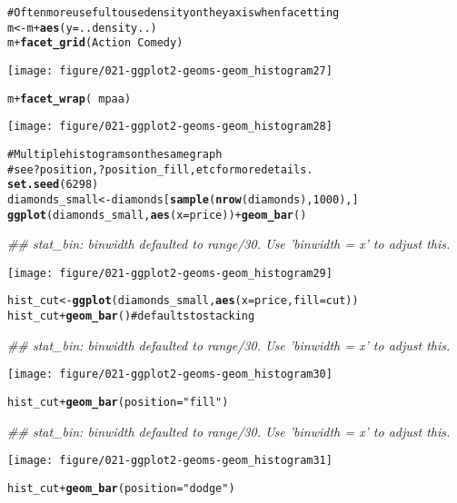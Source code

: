 \documentclass[a4paper,titlepage]{tufte-handout}\usepackage{graphicx, color}
\makeatletter
\def\maxwidth{ %
  \ifdim\Gin@nat@width>\linewidth
    \linewidth
  \else
    \Gin@nat@width
  \fi
}
\newcommand{\hlfunctioncall}[1]{\textcolor[rgb]{0.501960784313725,0,0.329411764705882}{\textbf{#1}}}%
\newcommand{\hlstring}[1]{\textcolor[rgb]{0.6,0.6,1}{#1}}%
\newcommand{\hlcomment}[1]{\textcolor[rgb]{0.180392156862745,0.6,0.341176470588235}{#1}}%
\newenvironment{kframe}{%
 \def\at@end@of@kframe{}%
 \ifinner\ifhmode%
  \def\at@end@of@kframe{\end{minipage}}%
  \begin{minipage}{\columnwidth}%
 \fi\fi%
 \def\FrameCommand##1{\hskip\@totalleftmargin \hskip-\fboxsep
 \colorbox{shadecolor}{##1}\hskip-\fboxsep
     \hskip-\linewidth \hskip-\@totalleftmargin \hskip\columnwidth}%
 \MakeFramed {\advance\hsize-\width
   \@totalleftmargin\z@ \linewidth\hsize
   \@setminipage}}%
 {\par\unskip\endMakeFramed%
 \at@end@of@kframe}
\newenvironment{knitrout}{}{} %
\makeatother
\begin{document}
\begin{knitrout}
\begin{kframe}
\begin{alltt}
\hlcomment{# Often more useful to use density on the y axis when facetting}
m <- m + \hlfunctioncall{aes}(y = ..density..)
m + \hlfunctioncall{facet_grid}(Action ~ Comedy)
\end{alltt}
\end{kframe}
\texttt{[image: figure/021-ggplot2-geoms-geom\_histogram27]} 
\begin{kframe}\begin{alltt}
m + \hlfunctioncall{facet_wrap}(~ mpaa)
\end{alltt}
\end{kframe}
\texttt{[image: figure/021-ggplot2-geoms-geom\_histogram28]} 
\begin{kframe}\begin{alltt}

\hlcomment{# Multiple histograms on the same graph}
\hlcomment{# see ?position, ?position_fill, etc for more details.}
\hlfunctioncall{set.seed}(6298)
diamonds_small <- diamonds[\hlfunctioncall{sample}(\hlfunctioncall{nrow}(diamonds), 1000), ]
\hlfunctioncall{ggplot}(diamonds_small, \hlfunctioncall{aes}(x=price)) + \hlfunctioncall{geom_bar}()
\end{alltt}


{\ttfamily\noindent\itshape\textcolor{messagecolor}{\#\# stat\_bin: binwidth defaulted to range/30. Use 'binwidth = x' to adjust this.}}\end{kframe}
\texttt{[image: figure/021-ggplot2-geoms-geom\_histogram29]} 
\begin{kframe}\begin{alltt}
hist_cut <- \hlfunctioncall{ggplot}(diamonds_small, \hlfunctioncall{aes}(x=price, fill=cut))
hist_cut + \hlfunctioncall{geom_bar}() \hlcomment{# defaults to stacking}
\end{alltt}


{\ttfamily\noindent\itshape\textcolor{messagecolor}{\#\# stat\_bin: binwidth defaulted to range/30. Use 'binwidth = x' to adjust this.}}\end{kframe}
\texttt{[image: figure/021-ggplot2-geoms-geom\_histogram30]} 
\begin{kframe}\begin{alltt}
hist_cut + \hlfunctioncall{geom_bar}(position=\hlstring{"fill"})
\end{alltt}


{\ttfamily\noindent\itshape\textcolor{messagecolor}{\#\# stat\_bin: binwidth defaulted to range/30. Use 'binwidth = x' to adjust this.}}\end{kframe}
\texttt{[image: figure/021-ggplot2-geoms-geom\_histogram31]} 
\begin{kframe}\begin{alltt}
hist_cut + \hlfunctioncall{geom_bar}(position=\hlstring{"dodge"})
\end{alltt}



\end{kframe}
\end{knitrout}
\end{document}
